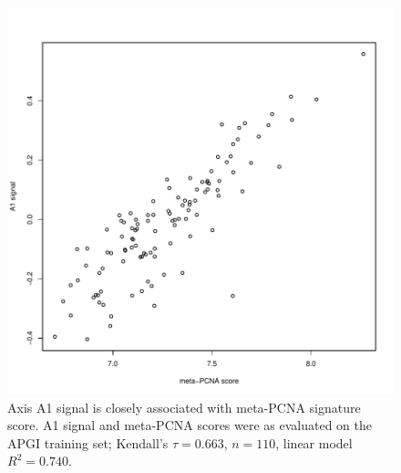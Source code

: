 \documentclass[dissertation.tex]{subfiles}
\begin{document}
\begin{figure}
\centering
\includegraphics[width=.7\linewidth]{analysis/biosurv/reports/18_SIS_diag_dsd_final/figure/nmf-msigdb-cor-plots-7}
\caption[A1 signal is closely associated with meta-PCNA score]{Axis A1 signal is closely associated with meta-PCNA signature score.  A1 signal and meta-PCNA \cite{Venet2011} scores were as evaluated on the \acrshort{APGI} training set; Kendall's $\tau = 0.663$, $n = 110$, linear model $R^2 = 0.740$.}\label{fig:sigs-axis1-pcna}
\end{figure}
\end{document}
